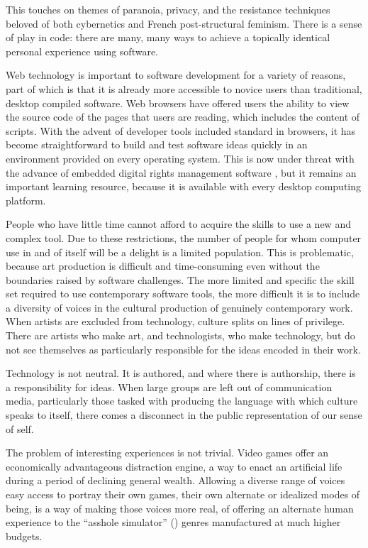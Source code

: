 This touches on themes of paranoia, privacy, and the resistance techniques beloved of both cybernetics and French post-structural feminism. There is a sense of play in code: there are many, many ways to achieve a topically identical personal experience using software.

Web technology is important to software development for a variety of reasons, part of which is that it is already more accessible to novice users than traditional, desktop compiled software. Web browsers have offered users the ability to view the source code of the pages that users are reading, which includes the content of scripts. With the advent of developer tools included standard in browsers, it has become straightforward to build and test software ideas quickly in an environment provided on every operating system. This is now under threat with the advance of embedded digital rights management software \cite{arstechnicadrm}, but it remains an important learning resource, because it is available with every desktop computing platform.

People who have little time cannot afford to acquire the skills to use a new and complex tool. Due to these restrictions, the number of people for whom computer use in and of itself will be a delight is a limited population. This is problematic, because art production is difficult and time-consuming even without the boundaries raised by software challenges. The more limited and specific the skill set required to use contemporary software tools, the more difficult it is to include a diversity of voices in the cultural production of genuinely contemporary work. When artists are excluded from technology, culture splits on lines of privilege. There are artists who make art, and technologists, who make technology, but do not see themselves as particularly responsible for the ideas encoded in their work. 

Technology is not neutral. It is authored, and where there is authorship, there is a responsibility for ideas. When large groups are left out of communication media, particularly those tasked with producing the language with which culture speaks to itself, there comes a disconnect in the public representation of our sense of self. 

The problem of interesting experiences is not trivial. Video games offer an economically advantageous distraction engine, a way to enact an artificial life during a period of declining general wealth. Allowing a diverse range of voices easy access to portray their own games, their own alternate or idealized modes of being, is a way of making those voices more real, of offering an alternate human experience to the “asshole simulator” (\cite{bissell}) genres manufactured at much higher budgets.


